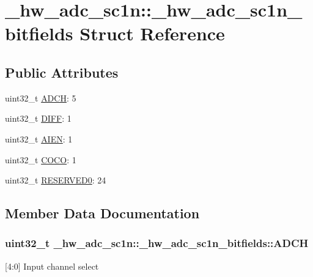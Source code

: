 \hypertarget{struct__hw__adc__sc1n_1_1__hw__adc__sc1n__bitfields}{}\section{\+\_\+hw\+\_\+adc\+\_\+sc1n\+:\+:\+\_\+hw\+\_\+adc\+\_\+sc1n\+\_\+bitfields Struct Reference}
\label{struct__hw__adc__sc1n_1_1__hw__adc__sc1n__bitfields}
\subsection*{Public Attributes}
\begin{DoxyCompactItemize}
\item 
uint32\+\_\+t \hyperlink{struct__hw__adc__sc1n_1_1__hw__adc__sc1n__bitfields_a9a8033da3eb7a122c3dad990b673e641}{A\+D\+CH}\+: 5
\item 
uint32\+\_\+t \hyperlink{struct__hw__adc__sc1n_1_1__hw__adc__sc1n__bitfields_a80c7eaa28025a9635c3ca8a43a478d70}{D\+I\+FF}\+: 1
\item 
uint32\+\_\+t \hyperlink{struct__hw__adc__sc1n_1_1__hw__adc__sc1n__bitfields_a5940f48897e0dab3d761fdce5e4b2215}{A\+I\+EN}\+: 1
\item 
uint32\+\_\+t \hyperlink{struct__hw__adc__sc1n_1_1__hw__adc__sc1n__bitfields_a1ab11e64f20c8225342f07bb802c1058}{C\+O\+CO}\+: 1
\item 
uint32\+\_\+t \hyperlink{struct__hw__adc__sc1n_1_1__hw__adc__sc1n__bitfields_ade1156a3b9dee2e3b0c85d8d0d09ff6b}{R\+E\+S\+E\+R\+V\+E\+D0}\+: 24
\end{DoxyCompactItemize}


\subsection{Member Data Documentation}
\subsubsection[{\texorpdfstring{A\+D\+CH}{ADCH}}]{\setlength{\rightskip}{0pt plus 5cm}uint32\+\_\+t \+\_\+hw\+\_\+adc\+\_\+sc1n\+::\+\_\+hw\+\_\+adc\+\_\+sc1n\+\_\+bitfields\+::\+A\+D\+CH}\hypertarget{struct__hw__adc__sc1n_1_1__hw__adc__sc1n__bitfields_a9a8033da3eb7a122c3dad990b673e641}{}\label{struct__hw__adc__sc1n_1_1__hw__adc__sc1n__bitfields_a9a8033da3eb7a122c3dad990b673e641}
\mbox{[}4\+:0\mbox{]} Input channel select 

